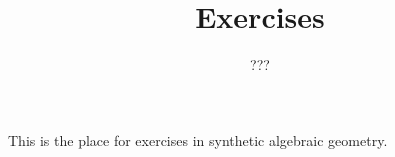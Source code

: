 \documentclass{../util/zariski-small}
\title{Exercises}
\theoremstyle{break}
\begin{document}
\author{???}

\maketitle

This is the place for exercises in synthetic algebraic geometry.

\printbibliography
\end{document}
